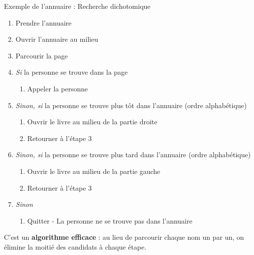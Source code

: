 \begin{UPSTIinfor}{Exemple de l'annuaire : Recherche dichotomique}
	\begin{enumerate}
		\item Prendre l'annuaire
		\item Ouvrir l'annuaire au milieu 
		\item Parcourir la page
		\item \textit{Si} la personne se trouve dans la page
		\begin{enumerate}
			\item Appeler la personne
		\end{enumerate}
		\item \textit{Sinon, si} la personne se trouve plus tôt dans l'annuaire (ordre alphabétique)
		\begin{enumerate}
			\item Ouvrir le livre au milieu de la partie droite
			\item Retourner à l'étape 3
		\end{enumerate}
		\item \textit{Sinon, si} la personne se trouve plus tard dans l'annuaire (ordre alphabétique)
		\begin{enumerate}
			\item Ouvrir le livre au milieu de la partie gauche
			\item Retourner à l'étape 3
		\end{enumerate}
		\item \textit{Sinon}
		\begin{enumerate}
			\item Quitter - La personne ne se trouve pas dans l'annuaire
		\end{enumerate}
	\end{enumerate}
\end{UPSTIinfor}

C’est un \textbf{algorithme efficace} : au lieu de parcourir chaque nom un par un, on élimine la moitié des candidats à chaque étape.